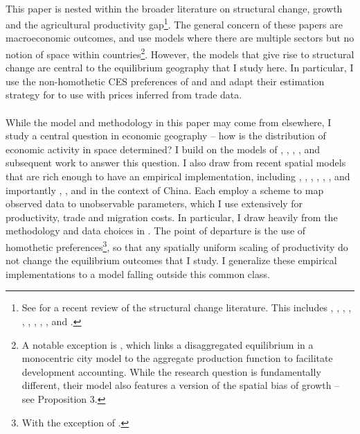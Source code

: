 \documentclass[]{article}
\theoremstyle{plain}
\begin{document}
\paragraph*{}
This paper is nested within the broader literature on structural change, growth and the agricultural productivity gap\footnote{See \citet{hrvch6} for a recent review of the structural change literature. This includes \citet{ngaipissa}, \citet{boppart2014}, \citet{cominetal2021}, \citet{matsuyama1992, matsuyama2009, engelslawglobal}, \citet{uy2013}, \citet{bustos1996etal}, \citet{bustos2020etal}, \citet{swiecki2017}, \citet{loganetal}, \citet{cravinosotelo}  and \citet{duarterestuccia}.}. The general concern of these papers are macroeconomic outcomes, and use models where there are multiple sectors but no notion of space within countries\footnote{A notable exception is \citet{karadi2017cattle}, which links a disaggregated equilibrium in a monocentric city model to the aggregate production function to facilitate development accounting. While the research question is fundamentally different, their model also features a version of the spatial bias of growth -- see Proposition 3.}. However, the models that give rise to structural change are central to the equilibrium geography that I study here. In particular, I use the non-homothetic CES preferences of \citet{cominetal2021} and \citet{loganetal} and adapt their estimation strategy for to use with prices inferred from trade data. 
\paragraph*{}
While the model and methodology in this paper may come from elsewhere, I study a central question in economic geography -- how is the distribution of economic activity in space determined? I build on the models of \citet{krugman1991}, \citet{PUGA1999}, \citet{aggtraderev}, \citet{MURATA2008}, \citet{donalddavishme} and subsequent work to answer this question. I also draw from recent spatial models that are rich enough to have an empirical implementation, including \citet{allenarkolakis}, \citet{redding2016}, \citet{nagyhinterlands}, \citet{pathdep}, \citet{geodev}, \citet{sotello2020}, \cite{eckertpeters} and importantly \citet{tombezhu}, \citet{hao2020}, \citet{MA2020} and \cite{Fan2019} in the context of China. Each employ a scheme to map observed data to unobservable parameters, which I use extensively for productivity, trade and migration costs. In particular, I draw heavily from the methodology and data choices in \citet{tombezhu}. The point of departure is the use of homothetic preferences\footnote{With the exception of \cite{hao2020}.}, so that any spatially uniform scaling of productivity do not change the equilibrium outcomes that I study. I generalize these empirical implementations to a model falling outside this common class.  
\end{document}
